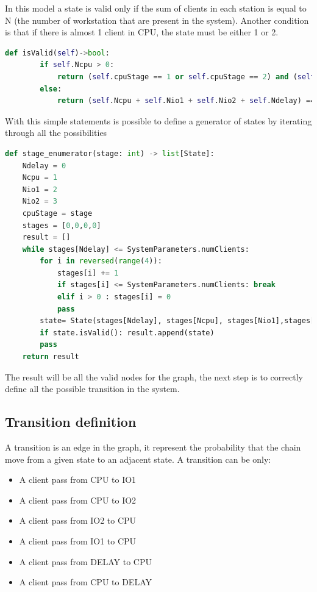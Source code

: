 \documentclass[12pt,a4paper]{article}
\begin{document}
In this model a state is valid only if the sum of clients in each station is equal to N (the number of workstation that are present in the system). Another condition is that if there is almost 1 client in CPU, the state must be either 1 or 2.

\begin{lstlisting}[language=python,breaklines]
    def isValid(self)->bool:
        if self.Ncpu > 0:
            return (self.cpuStage == 1 or self.cpuStage == 2) and (self.Ncpu + self.Nio1 + self.Nio2 + self.Ndelay) == SystemParameters.numClients
        else:
            return (self.Ncpu + self.Nio1 + self.Nio2 + self.Ndelay) == SystemParameters.numClients
\end{lstlisting}
\pagebreak
With this simple statements is possible to define a generator of states by iterating through all the possibilities 

\begin{lstlisting}[language=python,breaklines]
def stage_enumerator(stage: int) -> list[State]:
    Ndelay = 0
    Ncpu = 1
    Nio1 = 2
    Nio2 = 3
    cpuStage = stage
    stages = [0,0,0,0]
    result = []
    while stages[Ndelay] <= SystemParameters.numClients:
        for i in reversed(range(4)):
            stages[i] += 1
            if stages[i] <= SystemParameters.numClients: break
            elif i > 0 : stages[i] = 0
            pass
        state= State(stages[Ndelay], stages[Ncpu], stages[Nio1],stages[Nio2],stage)
        if state.isValid(): result.append(state)
        pass
    return result
\end{lstlisting}

The result will be all the valid nodes for the graph, the next step is to correctly define all the possible transition in the system.

\subsection{Transition definition}
A transition is an edge in the graph, it represent the probability that the chain move from a given state to an adjacent state. A transition can be only:
\begin{itemize}
    \item A client pass from CPU to IO1 
    \item A client pass from CPU to IO2 
    \item A client pass from IO2 to CPU
    \item A client pass from IO1 to CPU
    \item A client pass from DELAY to CPU
    \item A client pass from CPU to DELAY
\end{itemize}
\end{document}
